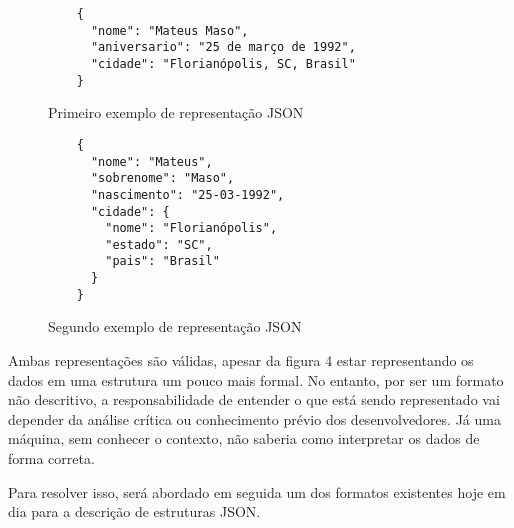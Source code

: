 \begin{figure}[H]
  \centering
  \begin{verbatim}
    {
      "nome": "Mateus Maso",
      "aniversario": "25 de março de 1992",
      "cidade": "Florianópolis, SC, Brasil"
    }
  \end{verbatim}
  \caption{Primeiro exemplo de representação JSON}
\end{figure}

\begin{figure}[H]
  \centering
  \begin{verbatim}
    {
      "nome": "Mateus",
      "sobrenome": "Maso",
      "nascimento": "25-03-1992",
      "cidade": {
        "nome": "Florianópolis",
        "estado": "SC",
        "pais": "Brasil"
      }
    }
  \end{verbatim}
  \caption{Segundo exemplo de representação JSON}
\end{figure}

Ambas representações são válidas, apesar da figura 4 estar representando os dados em uma estrutura um pouco mais formal. No entanto, por ser um formato não descritivo, a responsabilidade de entender o que está sendo representado vai depender da análise crítica ou conhecimento prévio dos desenvolvedores. Já uma máquina, sem conhecer o contexto, não saberia como interpretar os dados de forma correta. \cite{Droettboom2015}

Para resolver isso, será abordado em seguida um dos formatos existentes hoje em dia para a descrição de estruturas JSON.
